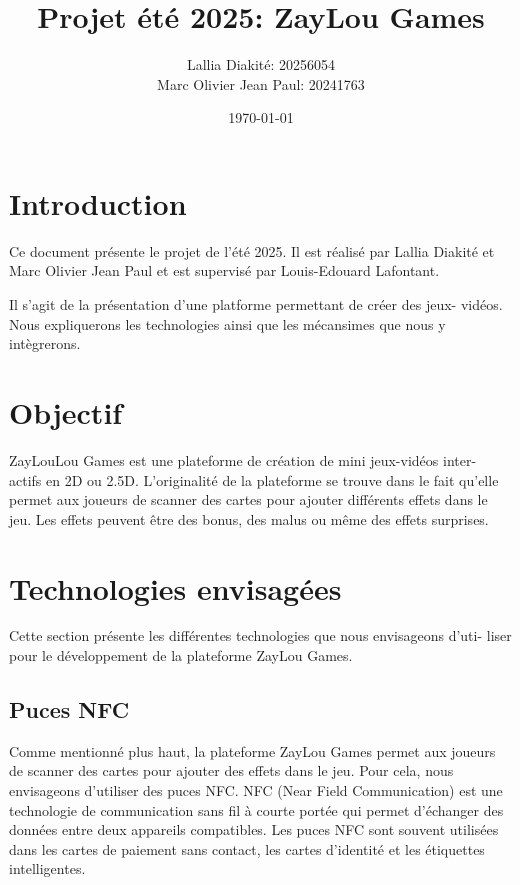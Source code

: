 \documentclass{article}             %
\title{Projet été 2025: ZayLou Games}             %
\author{                            %
    Lallia Diakité: 20256054 \\
    Marc Olivier Jean Paul: 20241763
}
\date{\today}                       %
\begin{document}

\maketitle                          %

\section{Introduction}              %
\label{sec:intro}                   %
Ce document présente le projet de l'été 2025. Il est réalisé par Lallia Diakité
et Marc Olivier Jean Paul et est supervisé par Louis-Edouard Lafontant.

Il s'agit de la présentation d'une platforme permettant de créer des jeux-
vidéos. Nous expliquerons les technologies ainsi que les mécansimes que nous y
intègrerons.

\section{Objectif}
\label{sec:objectifs}               %
ZayLouLou Games est une plateforme de création de mini jeux-vidéos inter-
actifs en 2D ou 2.5D. L'originalité de la plateforme se trouve dans le fait qu'elle
permet aux joueurs de scanner des cartes pour ajouter différents effets dans le
jeu. Les effets peuvent être des bonus, des malus ou même des effets surprises.

\section{Technologies envisagées}
\label{sec:technologies}       %
Cette section présente les différentes technologies que nous envisageons d'uti-
liser pour le développement de la plateforme ZayLou Games.

\subsection{Puces NFC}
Comme mentionné plus haut, la plateforme ZayLou Games permet aux
joueurs de scanner des cartes pour ajouter des effets dans le jeu. Pour cela, nous
envisageons d'utiliser des puces NFC. NFC (Near Field Communication) est une
technologie de communication sans fil à courte portée qui permet d'échanger des
données entre deux appareils compatibles. Les puces NFC sont souvent utilisées
dans les cartes de paiement sans contact, les cartes d'identité et les étiquettes
intelligentes.
\end{document}
